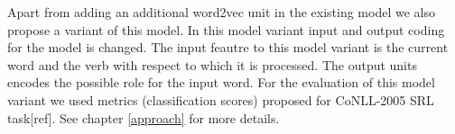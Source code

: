 Apart from adding an additional word2vec unit in the existing model we also propose a variant of this model. In this model variant input and output coding for the model is changed. The input feautre to this model variant is the current word and the verb with respect to which it is processed. The output units encodes the possible role for the input word. For the evaluation of this model variant we used metrics (classification scores) proposed for CoNLL-2005 SRL task[ref]. See chapter \ref{approach} for more details.






